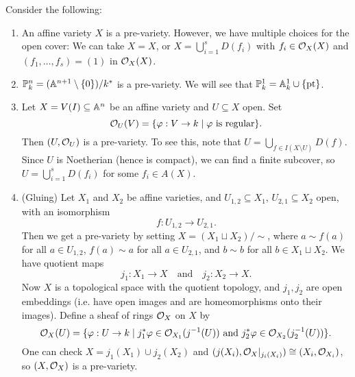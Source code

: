 \begin{example}
  Consider the following:
  \begin{enumerate}
    \item An affine variety $X$ is a
      pre-variety.
      However, we have multiple
      choices for the open cover:
      We can take $X = X$, or
      $X = \bigcup_{i = 1}^s D(f_i)$
      with $f_i \in \mathcal{O}_X(X)$ and
      $(f_1, \dots, f_s) = (1)$
      in $\mathcal{O}_X(X)$.
    \item $\mathbb{P}^n_k = (\mathbb{A}^{n + 1} \setminus \{0\}) / k^*$ is
      a pre-variety. We will see that
      $\mathbb{P}^1_k = \mathbb{A}^1_k \cup \{\mathrm{pt}\}$.
    \item Let $X = V(I) \subseteq \mathbb{A}^n$
      be an affine variety and $U \subseteq X$ open.
      Set
      \[
        \mathcal{O}_U(V) = \{\varphi : V \to k \mid \varphi \text{ is regular}\}.
      \]
      Then $(U, \mathcal{O}_U)$ is a pre-variety.
      To see this, note that
      $U = \bigcup_{f \in I(X \setminus U)} D(f)$.
      Since $U$ is Noetherian (hence is
      compact), we can find a finite subcover,
      so $U = \bigcup_{i = 1}^s D(f_i)$
      for some $f_i \in A(X)$.
    \item (Gluing) Let
      $X_1$ and $X_2$ be affine varieties,
      and $U_{1,2} \subseteq X_1$,
      $U_{2,1} \subseteq X_2$ open, with
      an isomorphism
      \[
        f : U_{1, 2} \longrightarrow U_{2, 1}.
      \]
      Then we get a pre-variety by
      setting
      $X = (X_1 \sqcup X_2) / {\sim}$,
      where
      $a \sim f(a)$ for all $a \in U_{1, 2}$,
      $f(a) \sim a$ for all
      $a \in U_{2, 1}$, and
      $b \sim b$ for all $b \in X_1 \sqcup X_2$.
      We have quotient maps
      \[
        j_1 : X_1 \longrightarrow X
        \quad \text{and} \quad
        j_2 : X_2 \longrightarrow X.
      \]
      Now $X$ is a topological space
      with the quotient topology, and 
      $j_1, j_2$ are open embeddings
      (i.e. have open images and are
      homeomorphisms onto their images).
      Define a sheaf of rings
      $\mathcal{O}_X$ on $X$ by
      \[
        \mathcal{O}_X(U)
        = \{\varphi : U \to k \mid j_1^* \varphi \in \mathcal{O}_{X_1}(j^{-1}(U)) \text{ and } j_2^* \varphi \in \mathcal{O}_{X_2}(j_2^{-1}(U))\}.
      \]
      One can check
      $X = j_1(X_1) \cup j_2(X_2)$ and
      $(j(X_i), \mathcal{O}_X|_{j_i(X_i)}) \cong (X_i, \mathcal{O}_{X_i})$,
      so $(X, \mathcal{O}_X)$ is a pre-variety.
  \end{enumerate}
\end{example}

